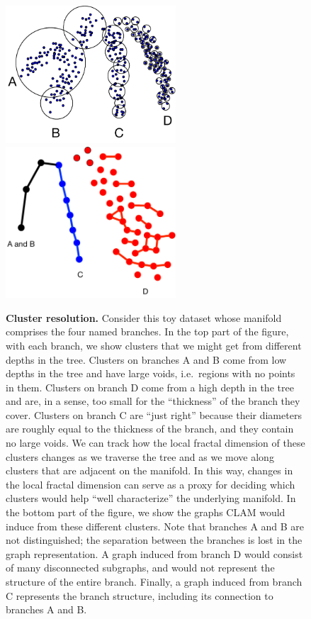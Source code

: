 \begin{figure}[ht!]
    \centering
    \includegraphics[width=2.5in]{images/cluster-resolution.pdf}\\
    \vspace{1cm}
    \includegraphics[width=2.5in]{images/cluster-resolution-graph.pdf}
    \caption{
        \textbf{Cluster resolution.}
        Consider this toy dataset whose manifold comprises the four named branches.
        In the top part of the figure, with each branch, we show clusters that we might get from different depths in the tree.
        Clusters on branches A and B come from low depths in the tree and have large voids, i.e.\ regions with no points in them.
        Clusters on branch D come from a high depth in the tree and are, in a sense, too small for the ``thickness'' of the branch they cover.
        Clusters on branch C are ``just right'' because their diameters are roughly equal to the thickness of the branch, and they contain no large voids.
        We can track how the local fractal dimension of these clusters changes as we traverse the tree and as we move along clusters that are adjacent on the manifold.
        In this way, changes in the local fractal dimension can serve as a proxy for deciding which clusters would help ``well characterize'' the underlying manifold.
        In the bottom part of the figure, we show the graphs CLAM would induce from these different clusters.
        Note that branches A and B are not distinguished; the separation between the branches is lost in the graph representation.
        A graph induced from branch D would consist of many disconnected subgraphs, and would not represent the structure of the entire branch.
        Finally, a graph induced from branch C represents the branch structure, including its connection to branches A and B.
    }
    \label{fig:methods:cluster-resolution}
\end{figure}



